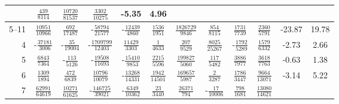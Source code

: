\documentclass[letterpaper,11pt,nointlimits,reqno,draft]{amsbook}
\begin{document}
\begin{table}
\begin{tabular}{r|ccccccccc|c@{ -- }c@{\%}}
&  $\frac{             439}{            8114}$
&  $\frac{           10720}{           81537}$
&  $\frac{            3302}{           10275}$
&  -5.35 &  4.96
\\ \hline
5--11
&  $\frac{           10951}{           10966}$
&  $\frac{             692}{           17487}$
& -$\frac{           58794}{           21577}$
& -$\frac{           12439}{            4860}$
&  $\frac{            1536}{            1951}$
&  $\frac{         1826729}{            9846}$
&  $\frac{             854}{            8115}$
&  $\frac{            1731}{            7739}$
&  $\frac{            2360}{            5791}$
&  -23.87 &  19.78
\\
4
& -$\frac{           37181}{            3006}$
& -$\frac{              35}{           19004}$
& -$\frac{         1709799}{           12403}$
&  $\frac{           11429}{            3303}$
&  $\frac{               1}{            4633}$
&  $\frac{             207}{            9529}$
&  $\frac{            8025}{           25267}$
& -$\frac{            1792}{            5289}$
&  $\frac{            1579}{            6332}$
&  -2.73 &  2.66
\\
5
&  $\frac{            6843}{            7364}$
& -$\frac{             113}{            5126}$
& -$\frac{           19508}{           11693}$
& -$\frac{           15410}{            9853}$
&  $\frac{            2215}{            5596}$
&  $\frac{          199827}{            5060}$
&  $\frac{             117}{            5482}$
&  $\frac{            3886}{            7977}$
&  $\frac{            3618}{            7763}$
&  -0.63 &  1.38
\\
6
&  $\frac{            1309}{            1894}$
&  $\frac{             472}{            6839}$
&  $\frac{           10796}{           10079}$
& -$\frac{           13268}{           14331}$
&  $\frac{            1942}{           14501}$
&  $\frac{          169657}{            5987}$
&  $\frac{               2}{            3287}$
&  $\frac{            1786}{            3447}$
&  $\frac{            9664}{           13071}$
&  -3.14 &  5.22
\\
7
&  $\frac{           62991}{           64619}$
&  $\frac{           10271}{           61625}$
& -$\frac{          146725}{           39021}$
& -$\frac{            6349}{           10362}$
&  $\frac{              23}{            3440}$
&  $\frac{           26371}{             794}$
& -$\frac{              17}{           10006}$
&  $\frac{             798}{            1681}$
&  $\frac{           13080}{           14621}$

\end{tabular}
\end{table}
\end{document}
